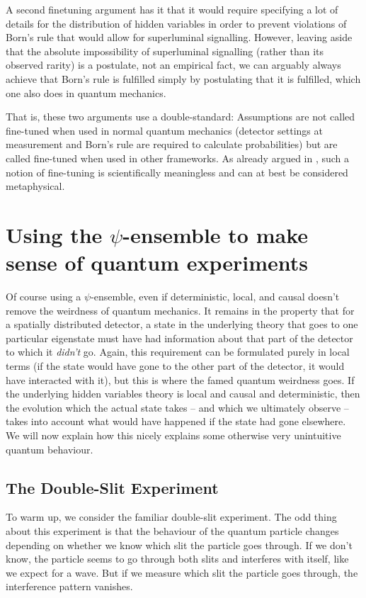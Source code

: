 \documentclass[superscriptaddress,floatfix,nofootinbib,12pt]{revtex4-2}
\begin{document}
A second finetuning argument \cite{Wood2015FineTuning} has it that it would require specifying a lot of details for the distribution of hidden variables in order to prevent violations of Born's rule that would allow for superluminal signalling. However, leaving aside that the absolute impossibility of superluminal signalling (rather than its observed rarity) is a postulate, not an empirical fact, we can arguably always achieve that Born's rule is fulfilled simply by postulating that it is fulfilled, which one also does in quantum mechanics. 

That is, these two arguments use a double-standard: Assumptions are not called fine-tuned when used in normal quantum mechanics (detector settings at measurement and Born's rule are required to calculate probabilities) but are called fine-tuned when used in other frameworks. As already argued in \cite{Hossenfelder2020SuperdeterminismGuide}, such a notion of fine-tuning is scientifically meaningless and can at best be considered metaphysical. 

\section{Using the \texorpdfstring{$\psi$}{psi}-ensemble to make sense of quantum experiments}
\label{exp}
Of course using a $\psi$-ensemble, even if deterministic, local, and causal doesn't remove the weirdness of quantum mechanics. It remains in the property that for a spatially distributed detector, a state in the underlying theory that goes to one particular eigenstate must have had information about that part of the detector to which it \emph{didn't} go. Again, this requirement can be formulated purely in local terms (if the state would have gone to the other part of the detector, it would have interacted with it), but this is where the famed quantum weirdness goes. If the underlying hidden variables theory is local and causal and deterministic, then the evolution which the actual state takes -- and which we ultimately observe -- takes into account what would have happened if the state had gone elsewhere. We will now explain how this nicely explains some otherwise very unintuitive quantum behaviour.

\subsection{The Double-Slit Experiment}

To warm up, we consider the familiar double-slit experiment. The odd thing about this experiment is that the behaviour of the quantum particle changes depending on whether we know which slit the particle goes through. If we don't know, the particle seems to go through both slits and interferes with itself, like we expect for a wave. But if we measure which slit the particle goes through, the interference pattern vanishes. 
\end{document}
